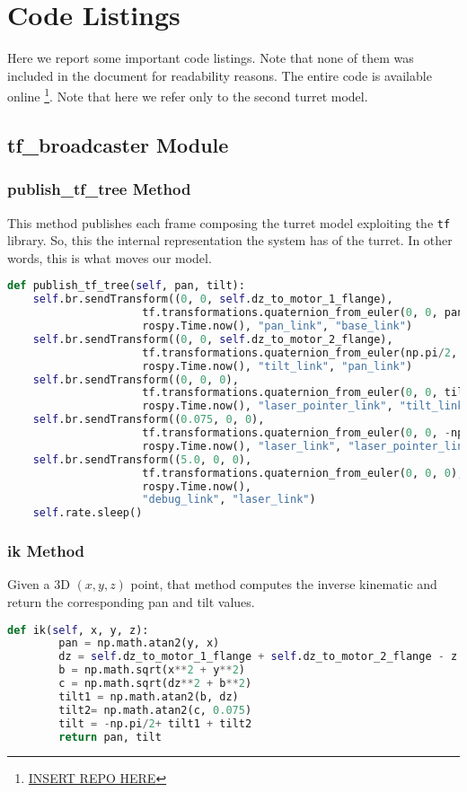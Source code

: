 \chapter{Code Listings}
\label{Appen:B}
Here we report some important code listings. Note that none of them was included in the document for readability reasons. The entire code is available online \footnote{\url{INSERT REPO HERE}}. Note that here we refer only to the second turret model.
\section*{tf\_broadcaster Module}\label{sec:tfbroadcaster}
\subsection*{publish\_tf\_tree Method}
This method publishes each frame composing the turret model exploiting the \texttt{tf} library. So, this the internal representation the system has of the turret. In other words, this is what moves our  model.
\begin{lstlisting}[caption={Publish Turret tf Tree},label={lst:tftree},language=Python]
def publish_tf_tree(self, pan, tilt):
    self.br.sendTransform((0, 0, self.dz_to_motor_1_flange),
                     tf.transformations.quaternion_from_euler(0, 0, pan),
                     rospy.Time.now(), "pan_link", "base_link")
    self.br.sendTransform((0, 0, self.dz_to_motor_2_flange),
                     tf.transformations.quaternion_from_euler(np.pi/2, -np.pi/2, 0),
                     rospy.Time.now(), "tilt_link", "pan_link")
    self.br.sendTransform((0, 0, 0),
                     tf.transformations.quaternion_from_euler(0, 0, tilt - np.pi/2),
                     rospy.Time.now(), "laser_pointer_link", "tilt_link")
    self.br.sendTransform((0.075, 0, 0),
                     tf.transformations.quaternion_from_euler(0, 0, -np.pi/2),
                     rospy.Time.now(), "laser_link", "laser_pointer_link")
    self.br.sendTransform((5.0, 0, 0),
                     tf.transformations.quaternion_from_euler(0, 0, 0),
                     rospy.Time.now(),
                     "debug_link", "laser_link")
    self.rate.sleep()
\end{lstlisting}
\subsection*{ik Method}
Given a 3D $(x, y, z)$ point, that method computes the inverse kinematic and return the corresponding pan and tilt values.
\begin{lstlisting}[caption={Inverse Kinematic},label={lst:ik},language=Python]
def ik(self, x, y, z):
        pan = np.math.atan2(y, x)
        dz = self.dz_to_motor_1_flange + self.dz_to_motor_2_flange - z
        b = np.math.sqrt(x**2 + y**2)
        c = np.math.sqrt(dz**2 + b**2)
        tilt1 = np.math.atan2(b, dz)
        tilt2= np.math.atan2(c, 0.075)
        tilt = -np.pi/2+ tilt1 + tilt2
        return pan, tilt
\end{lstlisting}
